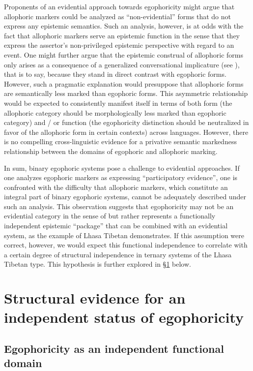 \documentclass[output=paper]{langsci/langscibook}
\begin{document}
Proponents of an evidential approach towards egophoricity might argue that allophoric markers could be analyzed as “non-evidential” forms that do not express any epistemic semantics. Such an analysis, however, is at odds with the fact that allophoric markers serve an epistemic function in the sense that they express the assertor’s non-privileged epistemic perspective with regard to an event. One might further argue that the epistemic construal of allophoric forms only arises as a consequence of a generalized conversational implicature (see \citealt{Levinson2000}), that is to say, because they stand in direct contrast with egophoric forms. However, such a pragmatic explanation would presuppose that allophoric forms are semantically less marked than egophoric forms. This asymmetric relationship would be expected to consistently manifest itself in terms of both form (the allophoric category should be morphologically less marked than egophoric category) and / or function (the egophoricity distinction should be neutralized in favor of the allophoric form in certain contexts) across languages. However, there is no compelling cross-linguistic evidence for a privative semantic markedness relationship between the domains of egophoric and allophoric marking.

In sum, binary egophoric systems pose a challenge to evidential approaches. If one analyzes egophoric markers as expressing “participatory evidence”, one is confronted with the difficulty that allophoric markers, which constitute an integral part of binary egophoric systems, cannot be adequately described under such an analysis. This observation suggests that egophoricity may not be an evidential category in the sense of \cite{Aikhenvald2004} but rather represents a functionally independent epistemic “package” that can be combined with an evidential system, as the example of Lhasa Tibetan demonstrates. If this assumption were correct, however, we would expect this functional independence to correlate with a certain degree of structural independence in ternary systems of the Lhasa Tibetan type. This hypothesis is further explored in §\ref{s:mw4} below.

\section{Structural evidence for an independent status of egophoricity}\label{s:mw4}
\subsection{Egophoricity as an independent functional domain}\label{s:mw4-1}
\end{document}
